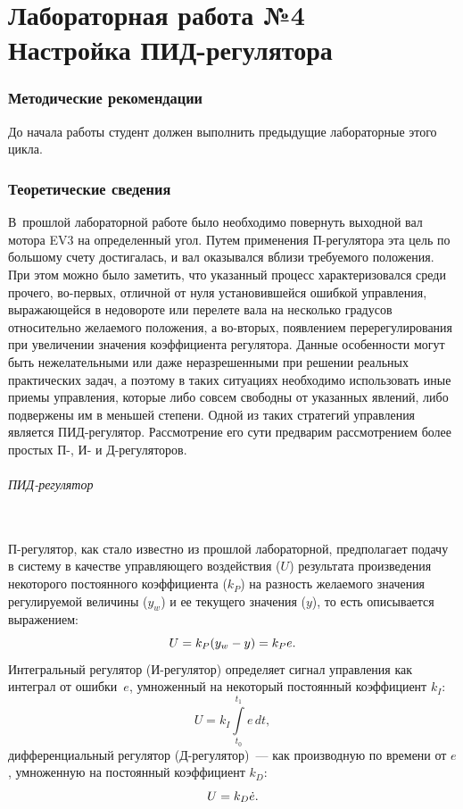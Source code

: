 \documentclass[12pt,a4paper,openany]{extarticle}
\begin{document}
\part*{Лабораторная работа №4\\
Настройка ПИД-регулятора}

\section{Методические рекомендации}
\hspace*{\parindent}До начала работы студент должен выполнить предыдущие лабораторные этого цикла.

\section{Теоретические сведения}
\hspace*{\parindent}В~прошлой лабораторной работе было необходимо повернуть выходной вал мотора EV3 на  определенный угол.
Путем применения П-регулятора эта цель по большому счету достигалась, и вал оказывался вблизи требуемого положения. 
При этом можно было заметить, что указанный процесс характеризовался среди прочего, во-первых, отличной от нуля установившейся ошибкой управления, выражающейся в недовороте или перелете вала на несколько градусов относительно желаемого положения, а во-вторых, появлением перерегулирования при увеличении значения коэффициента регулятора. 
Данные особенности могут быть нежелательными или даже неразрешенными при решении реальных практических задач, а поэтому в таких ситуациях необходимо использовать иные приемы управления, которые либо совсем свободны от указанных явлений, либо подвержены им в меньшей степени. Одной из таких стратегий управления является ПИД-регулятор.
Рассмотрение его сути предварим рассмотрением более простых П-, И- и Д-регуляторов.

\paragraph*{ПИД-регулятор}$\phantom{-}$\\
\hspace*{\parindent}П-регулятор, как стало известно из прошлой лабораторной, предполагает подачу в систему в качестве управляющего воздействия ($U$) результата произведения некоторого постоянного коэффициента ($k_P$) на разность желаемого значения регулируемой величины ($y_w$) и ее текущего значения ($y$), то есть описывается выражением:
\begin{equation}
U = k_P(y_w - y) = k_P e\ldotp
\end{equation}
Интегральный регулятор (И-регулятор) определяет сигнал управления как интеграл от ошибки~$e$, умноженный на некоторый постоянный коэффициент $k_I$:
\begin{equation}
U = k_I\int\limits_{t_0}^{t_1} \!e\,dt,
\end{equation} 
дифференциальный регулятор (Д-регулятор)~--- как производную по времени от $e$, умноженную на постоянный коэффициент $k_D$:
\begin{equation}\label{eq:definiton_of_D_regulator}
U = k_D\dot{e}\ldotp
\end{equation}
\end{document}
